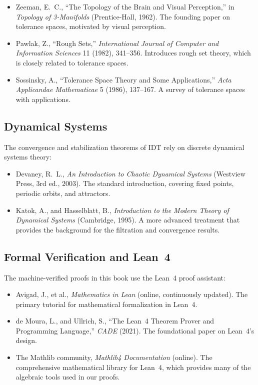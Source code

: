 \documentclass[11pt,openany]{book}
\theoremstyle{definition}
\theoremstyle{plain}
\theoremstyle{remark}
\begin{document}
\begin{itemize}
\item Zeeman, E.~C., ``The Topology of the Brain and Visual Perception,'' in \textit{Topology of 3-Manifolds} (Prentice-Hall, 1962). The founding paper on tolerance spaces, motivated by visual perception.
\item Pawlak, Z., ``Rough Sets,'' \textit{International Journal of Computer and Information Sciences} 11 (1982), 341--356. Introduces rough set theory, which is closely related to tolerance spaces.
\item Sossinsky, A., ``Tolerance Space Theory and Some Applications,'' \textit{Acta Applicandae Mathematicae} 5 (1986), 137--167. A survey of tolerance spaces with applications.
\end{itemize}

\subsection{Dynamical Systems}

The convergence and stabilization theorems of IDT rely on discrete dynamical systems theory:

\begin{itemize}
\item Devaney, R.~L., \textit{An Introduction to Chaotic Dynamical Systems} (Westview Press, 3rd ed., 2003). The standard introduction, covering fixed points, periodic orbits, and attractors.
\item Katok, A., and Hasselblatt, B., \textit{Introduction to the Modern Theory of Dynamical Systems} (Cambridge, 1995). A more advanced treatment that provides the background for the filtration and convergence results.
\end{itemize}

\subsection{Formal Verification and Lean~4}

The machine-verified proofs in this book use the Lean~4 proof assistant:

\begin{itemize}
\item Avigad, J., et al., \textit{Mathematics in Lean} (online, continuously updated). The primary tutorial for mathematical formalization in Lean~4.
\item de Moura, L., and Ullrich, S., ``The Lean~4 Theorem Prover and Programming Language,'' \textit{CADE} (2021). The foundational paper on Lean~4's design.
\item The Mathlib community, \textit{Mathlib4 Documentation} (online). The comprehensive mathematical library for Lean~4, which provides many of the algebraic tools used in our proofs.
\end{itemize}
\end{document}
